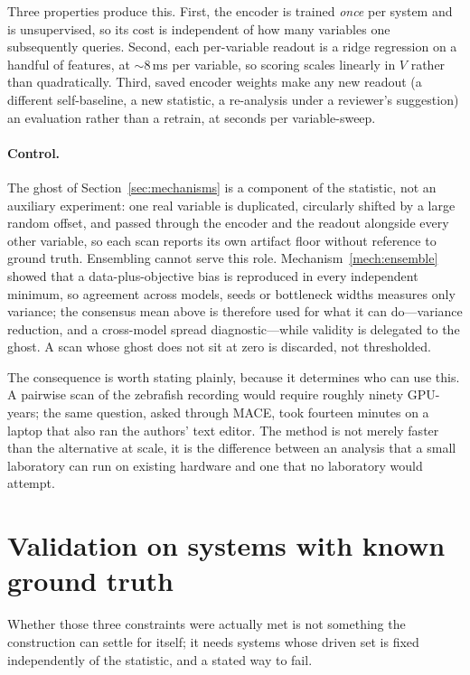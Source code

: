\documentclass[11pt]{article}
\begin{document}
Three properties produce this. First, the encoder is trained \emph{once}
per system and is unsupervised, so its cost is independent of how many
variables one subsequently queries. Second, each per-variable readout is a
ridge regression on a handful of features, at $\sim$8\,ms per variable,
so scoring scales linearly in $V$ rather than quadratically. Third, saved
encoder weights make any new readout (a different self-baseline, a new
statistic, a re-analysis under a reviewer's suggestion) an evaluation
rather than a retrain, at seconds per variable-sweep.

\paragraph{Control.} The ghost of Section~\ref{sec:mechanisms} is a component of the statistic, not an auxiliary experiment: one real variable is duplicated, circularly shifted by a large random offset, and passed through the encoder and the readout alongside every other variable, so each scan reports its own artifact floor without reference to ground truth. Ensembling cannot serve this role. Mechanism~\ref{mech:ensemble} showed that a data-plus-objective bias is reproduced in every independent minimum, so agreement across models, seeds or bottleneck widths measures only variance; the consensus mean above is therefore used for what it can do---variance reduction, and a cross-model spread diagnostic---while validity is delegated to the ghost. A scan whose ghost does not sit at zero is discarded, not thresholded.

The consequence is worth stating plainly, because it determines who can
use this. A pairwise scan of the zebrafish recording would require
roughly ninety GPU-years; the same question, asked through MACE,
took fourteen minutes on a laptop that also ran the authors' text editor.
The method is not merely faster than the alternative at scale, it is the
difference between an analysis that a small laboratory can run on
existing hardware and one that no laboratory would attempt.

\section{Validation on systems with known ground truth}
\label{sec:synthetic}

Whether those three constraints were actually met is not something the construction can settle for itself; it needs systems whose driven set is fixed independently of the statistic, and a stated way to fail.
\end{document}
